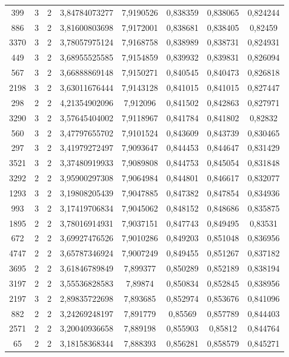 \begin{longtable}{|c|c|c|c|c|c|c|c|}
399 & 3 & 2 & 3,84784073277 & 7,9190526 & 0,838359 & 0,838065 & 0,824244 \\
886 & 3 & 2 & 3,81600803698 & 7,9172001 & 0,838681 & 0,838405 & 0,82459 \\
3370 & 3 & 2 & 3,78057975124 & 7,9168758 & 0,838989 & 0,838731 & 0,824931 \\
449 & 3 & 2 & 3,68955525585 & 7,9154859 & 0,839932 & 0,839831 & 0,826094 \\
567 & 3 & 2 & 3,66888869148 & 7,9150271 & 0,840545 & 0,840473 & 0,826818 \\
2198 & 3 & 2 & 3,63011676444 & 7,9143128 & 0,841015 & 0,841015 & 0,827447 \\
298 & 2 & 2 & 4,21354902096 & 7,912096 & 0,841502 & 0,842863 & 0,827971 \\
3290 & 3 & 2 & 3,57645404002 & 7,9118967 & 0,841784 & 0,841802 & 0,82832 \\
560 & 3 & 2 & 3,47797655702 & 7,9101524 & 0,843609 & 0,843739 & 0,830465 \\
297 & 3 & 2 & 3,41979272497 & 7,9093647 & 0,844453 & 0,844647 & 0,831429 \\
3521 & 3 & 2 & 3,37480919933 & 7,9089808 & 0,844753 & 0,845054 & 0,831848 \\
3292 & 2 & 2 & 3,95900297308 & 7,9064984 & 0,844801 & 0,846617 & 0,832077 \\
1293 & 3 & 2 & 3,19808205439 & 7,9047885 & 0,847382 & 0,847854 & 0,834936 \\
993 & 3 & 2 & 3,17419706834 & 7,9045062 & 0,848152 & 0,848686 & 0,835875 \\
1895 & 2 & 2 & 3,78016914931 & 7,9037151 & 0,847743 & 0,849495 & 0,83531 \\
672 & 2 & 2 & 3,69927476526 & 7,9010286 & 0,849203 & 0,851048 & 0,836956 \\
4747 & 2 & 2 & 3,65787346924 & 7,9007249 & 0,849455 & 0,851267 & 0,837182 \\
3695 & 2 & 2 & 3,61846789849 & 7,899377 & 0,850289 & 0,852189 & 0,838194 \\
3197 & 2 & 2 & 3,55536828583 & 7,89874 & 0,850834 & 0,852845 & 0,838956 \\
2197 & 3 & 2 & 2,89835722698 & 7,893685 & 0,852974 & 0,853676 & 0,841096 \\
882 & 2 & 2 & 3,24269248197 & 7,891779 & 0,85569 & 0,857789 & 0,844403 \\
2571 & 2 & 2 & 3,20040936658 & 7,889198 & 0,855903 & 0,85812 & 0,844764 \\
65 & 2 & 2 & 3,18158368344 & 7,888393 & 0,856281 & 0,858579 & 0,845271 \\

\end{longtable}
